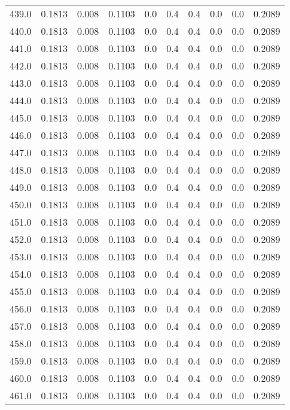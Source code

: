 \begin{longtable}{lrrrrrrrrr}
439.0 & 0.1813 & 0.008 & 0.1103 & 0.0 & 0.4 & 0.4 & 0.0 & 0.0 & 0.2089 \\
440.0 & 0.1813 & 0.008 & 0.1103 & 0.0 & 0.4 & 0.4 & 0.0 & 0.0 & 0.2089 \\
441.0 & 0.1813 & 0.008 & 0.1103 & 0.0 & 0.4 & 0.4 & 0.0 & 0.0 & 0.2089 \\
442.0 & 0.1813 & 0.008 & 0.1103 & 0.0 & 0.4 & 0.4 & 0.0 & 0.0 & 0.2089 \\
443.0 & 0.1813 & 0.008 & 0.1103 & 0.0 & 0.4 & 0.4 & 0.0 & 0.0 & 0.2089 \\
444.0 & 0.1813 & 0.008 & 0.1103 & 0.0 & 0.4 & 0.4 & 0.0 & 0.0 & 0.2089 \\
445.0 & 0.1813 & 0.008 & 0.1103 & 0.0 & 0.4 & 0.4 & 0.0 & 0.0 & 0.2089 \\
446.0 & 0.1813 & 0.008 & 0.1103 & 0.0 & 0.4 & 0.4 & 0.0 & 0.0 & 0.2089 \\
447.0 & 0.1813 & 0.008 & 0.1103 & 0.0 & 0.4 & 0.4 & 0.0 & 0.0 & 0.2089 \\
448.0 & 0.1813 & 0.008 & 0.1103 & 0.0 & 0.4 & 0.4 & 0.0 & 0.0 & 0.2089 \\
449.0 & 0.1813 & 0.008 & 0.1103 & 0.0 & 0.4 & 0.4 & 0.0 & 0.0 & 0.2089 \\
450.0 & 0.1813 & 0.008 & 0.1103 & 0.0 & 0.4 & 0.4 & 0.0 & 0.0 & 0.2089 \\
451.0 & 0.1813 & 0.008 & 0.1103 & 0.0 & 0.4 & 0.4 & 0.0 & 0.0 & 0.2089 \\
452.0 & 0.1813 & 0.008 & 0.1103 & 0.0 & 0.4 & 0.4 & 0.0 & 0.0 & 0.2089 \\
453.0 & 0.1813 & 0.008 & 0.1103 & 0.0 & 0.4 & 0.4 & 0.0 & 0.0 & 0.2089 \\
454.0 & 0.1813 & 0.008 & 0.1103 & 0.0 & 0.4 & 0.4 & 0.0 & 0.0 & 0.2089 \\
455.0 & 0.1813 & 0.008 & 0.1103 & 0.0 & 0.4 & 0.4 & 0.0 & 0.0 & 0.2089 \\
456.0 & 0.1813 & 0.008 & 0.1103 & 0.0 & 0.4 & 0.4 & 0.0 & 0.0 & 0.2089 \\
457.0 & 0.1813 & 0.008 & 0.1103 & 0.0 & 0.4 & 0.4 & 0.0 & 0.0 & 0.2089 \\
458.0 & 0.1813 & 0.008 & 0.1103 & 0.0 & 0.4 & 0.4 & 0.0 & 0.0 & 0.2089 \\
459.0 & 0.1813 & 0.008 & 0.1103 & 0.0 & 0.4 & 0.4 & 0.0 & 0.0 & 0.2089 \\
460.0 & 0.1813 & 0.008 & 0.1103 & 0.0 & 0.4 & 0.4 & 0.0 & 0.0 & 0.2089 \\
461.0 & 0.1813 & 0.008 & 0.1103 & 0.0 & 0.4 & 0.4 & 0.0 & 0.0 & 0.2089 \\

\end{longtable}
